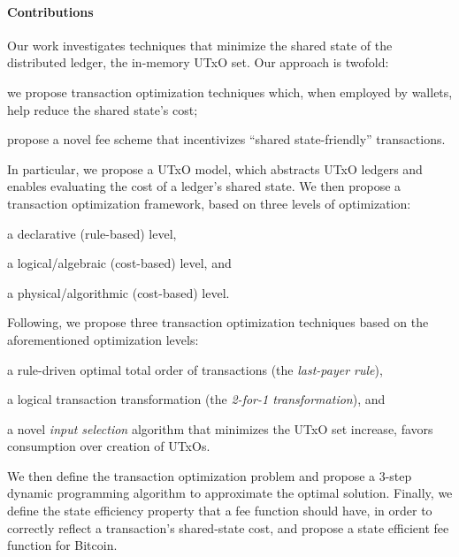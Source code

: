 \paragraph{Contributions}
Our work investigates techniques that minimize the shared state of the
distributed ledger, \ie the in-memory UTxO set. Our approach is twofold:
\begin{inparaenum}[a)]
    \item we propose transaction optimization techniques which, when employed
        by wallets, help reduce the shared state's cost;
    \item propose a novel fee scheme that incentivizes ``shared
        state-friendly'' transactions.
\end{inparaenum}

In particular, we propose a UTxO model, which abstracts UTxO ledgers and
enables evaluating the cost of a ledger’s shared state. We then
propose a transaction optimization framework, based on three levels of
optimization:
\begin{inparaenum}[a)]
    \item a declarative (rule-based) level,
    \item a logical/algebraic (cost-based) level, and
    \item a physical/algorithmic (cost-based) level.
\end{inparaenum}
Following, we propose three transaction optimization techniques based on the
aforementioned optimization levels:
\begin{inparaenum}[a)]
    \item a rule-driven optimal total order of transactions (the
        \emph{last-payer rule}),
    \item a logical transaction transformation (the \emph{2-for-1
        transformation}), and
    \item a novel \emph{input selection} algorithm that minimizes the UTxO set
        increase, \ie favors consumption over creation of UTxOs.
\end{inparaenum}
We then define the transaction optimization problem and propose a 3-step
dynamic programming algorithm to approximate the optimal solution.  Finally, we
define the state efficiency property that a fee function should have, in order
to correctly reflect a transaction's shared-state cost, and propose a state
efficient fee function for Bitcoin.
